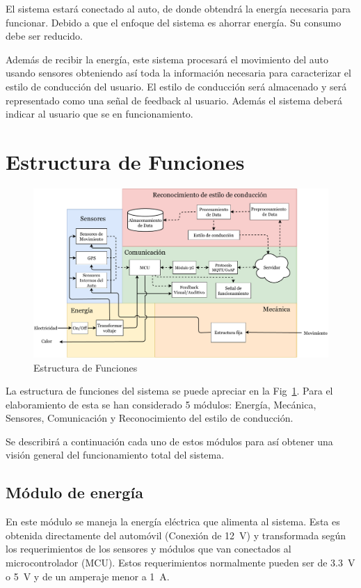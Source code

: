 El sistema estará conectado al auto, de donde obtendrá la energía necesaria para funcionar. Debido a que el enfoque del sistema es ahorrar energía. Su consumo debe ser reducido.

Además de recibir la energía, este sistema procesará el movimiento del auto usando sensores obteniendo así toda la información necesaria para caracterizar el estilo de conducción del usuario. El estilo de conducción será almacenado y será representado como una señal de feedback al usuario. Además el sistema deberá indicar al usuario que se en funcionamiento.

\section{Estructura de Funciones}

\begin{figure}
\centering
\includegraphics[width=\textwidth]{Tab3.pdf}
\caption{Estructura de Funciones}
\label{fig:3.2}
\end{figure}

La estructura de funciones del sistema se puede apreciar en la Fig~\ref{fig:3.2}. Para el elaboramiento de esta se han considerado 5 módulos: Energía, Mecánica, Sensores, Comunicación y Reconocimiento del estilo de conducción.

Se describirá a continuación cada uno de estos módulos para así obtener una visión general del funcionamiento total del sistema.

\subsection{Módulo de energía}
En este módulo se maneja la energía eléctrica que alimenta al sistema. Esta es obtenida directamente del automóvil (Conexión de \SI{12}{V}) y transformada según los requerimientos de los sensores y módulos que van conectados al microcontrolador (MCU). Estos requerimientos normalmente pueden ser de \SI{3.3}{V} o \SI{5}{V} y de un amperaje menor a \SI{1}{A}.

